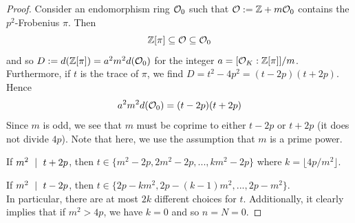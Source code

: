 \begin{proof}
    Consider an endomorphism ring $\mathcal{O}_0$ such that $\mathcal{O} := \mathbb{Z} + m\mathcal{O}_0$ contains the $p^2$-Frobenius $\pi$.
    Then
    \begin{equation*}
        \mathbb{Z}[\pi] \subseteq \mathcal{O} \subseteq \mathcal{O}_0
    \end{equation*}
    and so $D := d(\mathbb{Z}[\pi]) = a^2m^2d(\mathcal{O}_0)$ for the integer $a = [\mathcal{O}_K : \mathbb{Z}[\pi]] / m$.
    Furthermore, if $t$ is the trace of $\pi$, we find $D = t^2 - 4p^2 = (t - 2p)(t + 2p)$.
    Hence
    \begin{equation*}
        a^2m^2d(\mathcal{O}_0) = (t - 2p)(t + 2p)
    \end{equation*}
    Since $m$ is odd, we see that $m$ must be coprime to either $t - 2p$ or $t + 2p$ (it does not divide $4p$).
    Note that here, we use the assumption that $m$ is a prime power.

    If $m^2 \ \mid \  t + 2p$, then $t \in \{ m^2 - 2p, 2m^2 - 2p, ..., km^2 - 2p \}$ where $k = \lfloor 4p/m^2 \rfloor$.

    If $m^2 \ \mid \  t - 2p$, then $t \in \{ 2p - km^2, 2p - (k - 1)m^2, ..., 2p - m^2 \}$.
    \\
    In particular, there are at most $2k$ different choices for $t$.
    Additionally, it clearly implies that if $m^2 > 4p$, we have $k = 0$ and so $n = N = 0$.


\end{proof}
